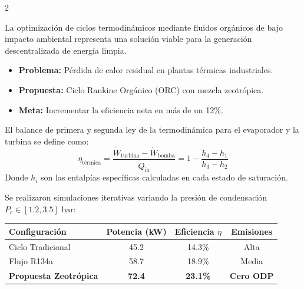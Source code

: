\documentclass[11pt]{article}
\begin{document}
\setlength{\columnsep}{1.6cm}
\begin{multicols}{2}

  \begin{tcolorbox}[title=1. Resumen y Justificación del Proyecto]
    La optimización de ciclos termodinámicos mediante fluidos orgánicos de bajo impacto ambiental representa una solución viable para la generación descentralizada de energía limpia.
    \begin{itemize}
      \item \textbf{Problema:} Pérdida de calor residual en plantas térmicas industriales.
      \item \textbf{Propuesta:} Ciclo Rankine Orgánico (ORC) con mezcla zeotrópica.
      \item \textbf{Meta:} Incrementar la eficiencia neta en más de un 12\%.
    \end{itemize}
  \end{tcolorbox}

  \vspace{0.4cm}

  \begin{tcolorbox}[title=2. Formulación y Balance de Energía]
    El balance de primera y segunda ley de la termodinámica para el evaporador y la turbina se define como:
    \begin{equation*}
      \eta_{\text{térmica}} = \frac{\dot{W}_{\text{turbina}} - \dot{W}_{\text{bomba}}}{\dot{Q}_{\text{in}}} = 1 - \frac{h_4 - h_1}{h_3 - h_2}
    \end{equation*}
    Donde $h_i$ son las entalpías específicas calculadas en cada estado de saturación.
  \end{tcolorbox}

  \vspace{0.4cm}

  \begin{tcolorbox}[title=3. Simulación y Curvas de Rendimiento]
    Se realizaron simulaciones iterativas variando la presión de condensación $P_c \in [1.2, 3.5]\text{ bar}$:
    \begin{center}
      \begin{tabular}{|l|c|c|c|}
        \hline
        \textbf{Configuración} & \textbf{Potencia (kW)} & \textbf{Eficiencia $\eta$} & \textbf{Emisiones} \\
        \hline
        Ciclo Tradicional & 45.2 & 14.3\% & Alta \\
        Flujo R134a & 58.7 & 18.9\% & Media \\
        \textbf{Propuesta Zeotrópica} & \textbf{72.4} & \textbf{23.1\%} & \textbf{Cero ODP} \\
        \hline
      \end{tabular}
    \end{center}
  \end{tcolorbox}


\end{multicols}
\end{document}

